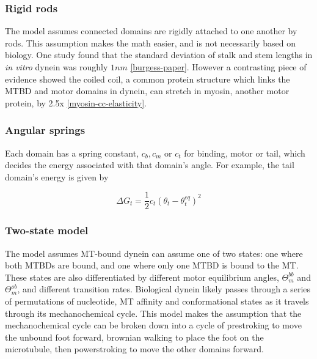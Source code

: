 \documentclass[10pt]{article} %
\begin{document}
\subsubsection{Rigid rods}
The model assumes connected domains are rigidly attached to one another by rods. This assumption makes the math easier, and is not necessarily based on biology. One study found that the standard deviation of stalk and stem lengths in \textit{in vitro} dynein was roughly $1nm$ \ref{burgess-paper}. However a contrasting piece of evidence showed the coiled coil, a common protein structure which links the MTBD and motor domains in dynein, can stretch in myosin, another motor protein, by 2.5x \ref{myosin-cc-elasticity}.

\subsubsection{Angular springs}
Each domain has a spring constant, $c_b, c_m$ or $c_t$ for binding, motor or tail, which decides the energy associated with that domain's angle. For example, the tail domain's energy is given by

\begin{equation}
  \Delta G_t = \frac12c_t\left(\theta_t - \theta_t^{eq}\right)^2
\end{equation}

\subsubsection{Two-state model}
The model assumes MT-bound dynein can assume one of two states: one where both MTBDs are bound, and one where only one MTBD is bound to the MT. These states are also differentiated by different motor equilibrium angles, $\Theta_{m}^{bb}$ and $\Theta_{m}^{ob}$, and different transition rates. Biological dynein likely passes through a series of permutations of nucleotide, MT affinity and conformational states as it travels through its mechanochemical cycle. This model makes the assumption that the mechanochemical cycle can be broken down into a cycle of prestroking to move the unbound foot forward, brownian walking to place the foot on the microtubule, then powerstroking to move the other domains forward.\\
\end{document}
